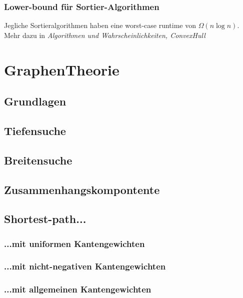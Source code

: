 \documentclass[a4paper]{article}
\begin{document}
     
    \subsubsection{Lower-bound für Sortier-Algorithmen}
    Jegliche Sortieralgorithmen haben eine worst-case runtime von $\Omega(n \log n)$. Mehr dazu in \textit{Algorithmen und Wahrscheinlichkeiten, ConvexHull}
        
        


\section{GraphenTheorie}

\subsection{Grundlagen}

\subsection{Tiefensuche}
    
\subsection{Breitensuche}
    
\subsection{Zusammenhangskompontente}
    
\subsection{Shortest-path...}
    
\subsubsection{...mit uniformen Kantengewichten}
    
\subsubsection{...mit nicht-negativen Kantengewichten}
    
\subsubsection{...mit allgemeinen Kantengewichten}
    
\end{document}
